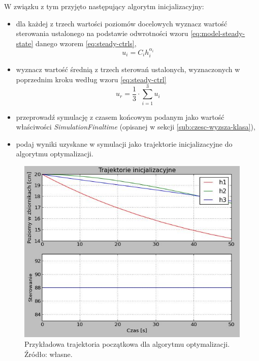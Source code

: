 W związku z tym przyjęto następujący algorytm inicjalizacyjny:
\begin{itemize}
    \item dla każdej z trzech wartości poziomów docelowych wyznacz wartość sterowania ustalonego na podstawie odwrotności wzoru \ref{eq:model-steady-state} danego wzorem \ref{eq:steady-ctrls},
    \begin{equation} \label{eq:steady-ctrls}
    u_{i} = C_{i}h_{i}^{\alpha_{i}}
    \end{equation}
    \item wyznacz wartość średnią z trzech sterowań ustalonych, wyznaczonych w poprzednim kroku według wzoru \ref{eq:steady-ctrl}
    \begin{equation}\label{eq:steady-ctrl}
    u_{r} = \frac{1}{3} \cdot \sum_{i=1}^{3} u_{i}
    \end{equation}
    \item przeprowadź symulację z czasem końcowym podanym jako wartość właściwości \emph{SimulationFinaltime} (opisanej w sekcji \ref{sub:czesc-wyzsza-klasa}),
    \item podaj wyniki uzyskane w symulacji jako trajektorie inicjalizacyjne do algorytmu optymalizacji.
\end{itemize}

\begin{figure}[ht]
    \centering
    \includegraphics[scale=0.9]{Grafika/initial_guess}
    \caption{Przykładowa trajektoria początkowa dla algorytmu optymalizacji. Źródło: własne.}
    \label{fig:initialguess}
\end{figure}

